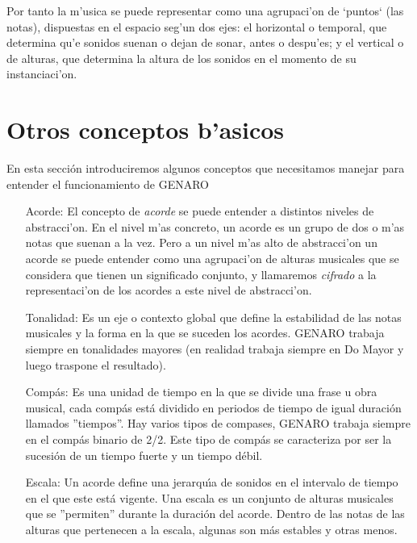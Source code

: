 Por tanto la m'usica se puede representar como una agrupaci'on de `puntos` (las notas), dispuestas en el espacio seg'un dos ejes: el horizontal o temporal, que determina qu'e sonidos suenan o dejan de sonar, antes o despu'es; y el vertical o de alturas, que determina la altura de los sonidos en el momento de su instanciaci'on.

\section{Otros conceptos b'asicos}
En esta secci\'on introduciremos algunos conceptos que necesitamos manejar para entender el funcionamiento de GENARO

\begin{itemize}

\item [Acorde:] El concepto de \emph{acorde} se puede entender a distintos niveles de abstracci'on. En el nivel m'as concreto, un acorde es un grupo de dos o m'as notas que suenan a la vez. Pero a un nivel m'as alto de abstracci'on un acorde se puede entender como una agrupaci'on de alturas musicales que se considera que tienen un significado conjunto, y llamaremos \emph{cifrado} a la representaci'on de los acordes a este nivel de abstracci'on. 

\item [Tonalidad:] Es un eje o contexto global que define la estabilidad de las notas musicales y la forma en la que se suceden los acordes. GENARO trabaja siempre en tonalidades mayores (en realidad trabaja siempre en Do Mayor y luego traspone el resultado).
 
\item [Comp\'as:] Es una unidad de tiempo en la que se divide una frase u obra musical, cada comp\'as est\'a dividido en periodos de tiempo de igual duraci\'on llamados ''tiempos''. Hay varios tipos de compases, GENARO trabaja siempre en el comp\'as binario de 2/2. Este tipo de comp\'as se caracteriza por ser la sucesi\'on de un tiempo fuerte y un tiempo d\'ebil.

\item [Escala:] Un acorde define una jerarqu\'\i a de sonidos en el intervalo de tiempo en el que este est\'a vigente. Una escala es un conjunto de alturas musicales que se ''permiten'' durante la duraci\'on del acorde. Dentro de las notas de las alturas que pertenecen a la escala, algunas son m\'as estables y otras menos.

\end{itemize}

